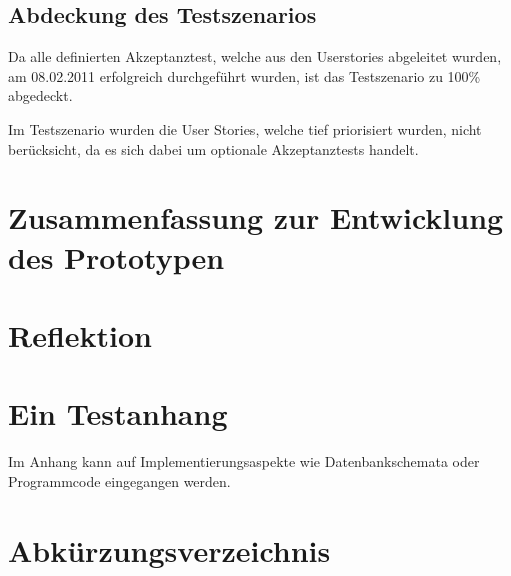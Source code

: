 \documentclass[abstracton, listof=totocnumbered,
bibliography=totocnumbered]{scrreprt}
\begin{document}
  \clearpage
  
  \section{Abdeckung des Testszenarios}
  
  Da alle definierten Akzeptanztest, welche aus den Userstories abgeleitet
  wurden, am 08.02.2011 erfolgreich durchgeführt wurden, ist das Testszenario zu
  100\% abgedeckt.
  
  Im Testszenario wurden die User Stories, welche tief priorisiert wurden, nicht
  berücksicht, da es sich dabei um optionale Akzeptanztests handelt.
  
  \newpage
  
  \chapter{Zusammenfassung zur Entwicklung des Prototypen}
  
  \chapter{Reflektion}
  
  
  \appendix
  
  \chapter{Ein Testanhang}
  
  Im Anhang kann auf Implementierungsaspekte wie Datenbankschemata
  oder Programmcode eingegangen werden.
  
  
  \chapter{Abkürzungsverzeichnis}
  \begin{acronym}
    \setlength{\itemsep}{-\parsep}
  \end{acronym}
  
\end{document}
